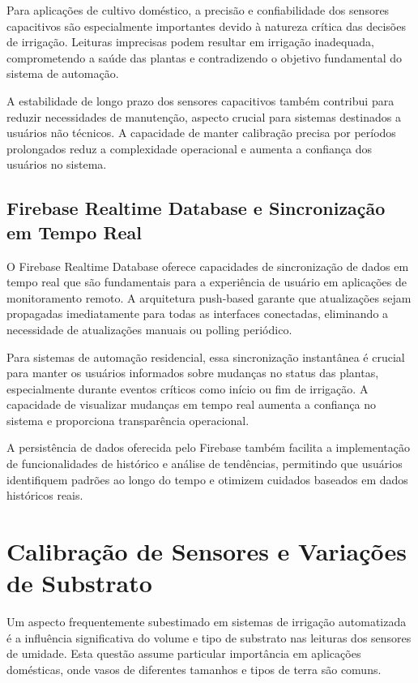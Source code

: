 \documentclass[twoside,english,brazilian]{UNISINOSmonografia}
\begin{document}
Para aplicações de cultivo doméstico, a precisão e confiabilidade dos sensores capacitivos são especialmente importantes devido à natureza crítica das decisões de irrigação. Leituras imprecisas podem resultar em irrigação inadequada, comprometendo a saúde das plantas e contradizendo o objetivo fundamental do sistema de automação.

A estabilidade de longo prazo dos sensores capacitivos também contribui para reduzir necessidades de manutenção, aspecto crucial para sistemas destinados a usuários não técnicos. A capacidade de manter calibração precisa por períodos prolongados reduz a complexidade operacional e aumenta a confiança dos usuários no sistema.

\subsection{Firebase Realtime Database e Sincronização em Tempo Real}

O Firebase Realtime Database oferece capacidades de sincronização de dados em tempo real que são fundamentais para a experiência de usuário em aplicações de monitoramento remoto. A arquitetura push-based garante que atualizações sejam propagadas imediatamente para todas as interfaces conectadas, eliminando a necessidade de atualizações manuais ou polling periódico.

Para sistemas de automação residencial, essa sincronização instantânea é crucial para manter os usuários informados sobre mudanças no status das plantas, especialmente durante eventos críticos como início ou fim de irrigação. A capacidade de visualizar mudanças em tempo real aumenta a confiança no sistema e proporciona transparência operacional.

A persistência de dados oferecida pelo Firebase também facilita a implementação de funcionalidades de histórico e análise de tendências, permitindo que usuários identifiquem padrões ao longo do tempo e otimizem cuidados baseados em dados históricos reais.

\section{Calibração de Sensores e Variações de Substrato}

Um aspecto frequentemente subestimado em sistemas de irrigação automatizada é a influência significativa do volume e tipo de substrato nas leituras dos sensores de umidade. Esta questão assume particular importância em aplicações domésticas, onde vasos de diferentes tamanhos e tipos de terra são comuns.
\end{document}
